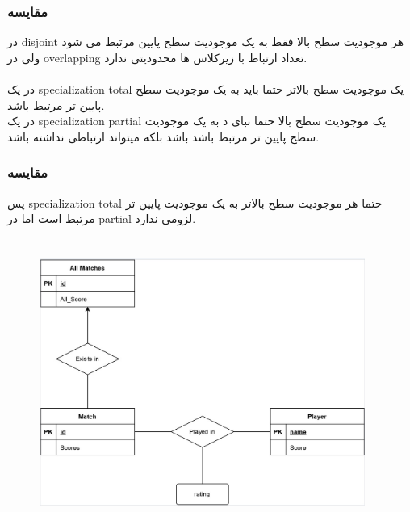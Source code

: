 \documentclass[a4paper]{article}
\makeatletter
\newcommand{\emailone}{\texttt{abbas.yazdanmehr1@gmail.com}}
\newcommand{\myinf}{
	\author{\noindent
عباس یزدان مهر
\\
99243077\\
 مهندسی کامپیوتر, دانشگاه شهید بهشتی
\\
\emailone
	}
}
\makeatother
\begin{document}
\subsubsection*{مقایسه}
در disjoint هر موجودیت سطح بالا فقط به یک موجودیت
سطح پایین مرتبط می شود ولی در overlapping تعداد ارتباط
با زیرکلاس ها محدودیتی ندارد.
\\ \\
در یک specialization total یک موجودیت سطح بالاتر حتما باید به یک موجودیت سطح پایین تر مرتبط باشد.
\\
در یک specialization partial یک موجودیت سطح بالا حتما نبای د به یک موجودیت سطح پایین تر مرتبط باشد 
باشد بلکه میتواند ارتباطی نداشته باشد. 

\subsubsection*{مقایسه}
پس specialization total حتما هر موجودیت سطح بالاتر 
به یک موجودیت پایین تر مرتبط است اما در partial لزومی ندارد.

\newpage
\myinf
\section{}

\begin{figure}[H]
  \begin{small}
    \begin{center}
      \includegraphics[width=0.95\textwidth]{figures/7.jpg}
    \end{center}
  \end{small}
\end{figure}
\end{document}
